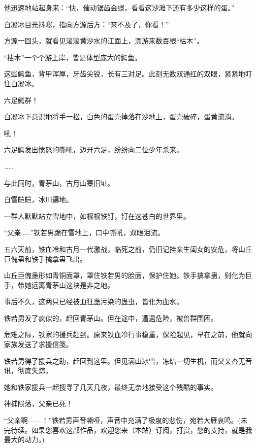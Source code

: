 \begin{this_body}
他迅速地站起身来：“快，催动锯齿金蜈，看看这沙滩下还有多少这样的蛋。”

白凝冰目光抖寒，指向方源后方：“来不及了，你看！”

方源一回头，就看见滚滚黄沙水的江面上，漂游来数百根“枯木”。

“枯木”一个个游上岸，皆是体型庞大的鳄鱼。

这些鳄鱼，背甲浑厚，牙齿尖锐，长有三对足。此刻无数双通红的双眼，紧紧地盯住白凝冰。

六足鳄群！

白凝冰下意识地将手一松，白色的蛋壳掉落在沙地上，蛋壳破碎，蛋黄流淌。

吼！

六足鳄发出愤怒的嘶吼，迈开六足，纷纷向二位少年杀来。

……

与此同时，青茅山，古月山寨旧址。

白雪皑皑，冰川遍地。

一群人默默站立雪地中，如根根铁钉，钉在这苍白的世界里。

“父亲……”铁若男跪在雪地上，口中嘶吼，双眼泪流。

五六天前，铁血冷和古月一代激战，临死之前，仍旧记挂亲生闺女的安危，将山丘巨傀蛊和铁手擒拿蛊飞出。

山丘巨傀蛊形如青铜面罩，罩住铁若男的脸面，保护住她。铁手擒拿蛊，则化为巨手，带她远离青茅山这块是非之地。

事后不久，这两只已经被血狂蛊污染的蛊虫，皆化为血水。

铁若男发了疯似的，赶回青茅山。但在途中，遭遇危险，被兽群围困。

危难之际，铁家的援兵赶到。原来铁血冷行事稳重，保险起见，早在之前，他就向家族发送了求援信笺。

铁若男得了援兵之助，赶回到这里。但见满山冰雪，冻结一切生机，而父亲杳无音讯，彻底失踪。

她和铁家援兵一起搜寻了几天几夜，最终无奈地接受这个残酷的事实。

神捕陨落，父亲已死！

“父亲啊——！”铁若男声音嘶哑，声音中充满了极度的悲伤，宛若大雁哀鸣。(未完待续。如果您喜欢这部作品，欢迎您来（本站）订阅，打赏，您的支持，就是我最大的动力。)

\end{this_body}

